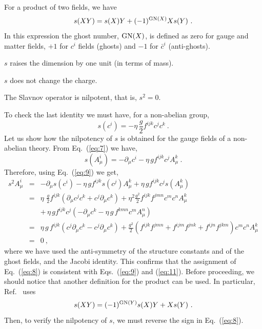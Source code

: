 \documentclass{ws-ijmpa}
\begin{document}
\begin{romanlist}[(ii)]
\item For a product of two fields, we have
  \begin{equation}
    \label{eq:9}
    s( X Y) = s(X) Y + (-1)^{{\rm GN}(X)} X s(Y)  \ .
  \end{equation}
In this expression the ghost number,
 ${\rm GN}(X)$, is defined as zero for gauge and matter fields, $+1$ for
$c^i$ fields (ghosts) and $-1$ for $\bar{c}^i$ (anti-ghosts).

\item $s$ raises the dimension by one unit (in terms of mass).

\item $s$ does not change the charge.

\item The Slavnov operator is nilpotent, that is, $s^2 =0$.

\end{romanlist}

To check the last identity we must have, for a non-abelian group,
%
\begin{equation}
  \label{eq:8}
  s(c^i) = -\eta\, \frac{g}{2} f^{ijk} c^j c^k\ .
\end{equation}
%
Let us show how the nilpotency of $s$ is obtained for the gauge fields
of a non-abelian theory. From Eq.~(\ref{eq:7}) we have,
%
\begin{equation}
  \label{eq:11}
  s(A_\mu^i) = -\partial_\mu c^i - \eta\, g f^{ijk} c^j A_\mu^k\ .
\end{equation}
%
Therefore, using Eq.~(\ref{eq:9}) we get,
%
\begin{eqnarray}
  s^2 A_\mu^i
&=&
-\partial_\mu s(c^i) - \eta\, g f^{ijk} s(c^j)A_\mu^k
  + \eta\, g f^{ijk} c^j s(A_\mu^k)
\nonumber\\
&=&
\eta\, \, \frac{g}{2}f^{ijk} \left( \partial_\mu c^j c^k +
    c^j \partial_\mu c^k \right)
+ \eta^2 \frac{g^2}{2} f^{ijk}
f^{jmn} c^m c^n A_\mu^k
\nonumber\\
&&
+\, \eta\, g f^{ijk} c^j \left(-\partial_\mu c^k
- \eta\, g\, f^{kmn} c^m A_\mu^n\right)
\nonumber\\
&=&
\eta\, g\, f^{ijk} \left( c^j \partial_\mu c^k - c^j \partial_\mu
  c^k \right)
+ \frac{g^2}{2} \left(f^{ijk} f^{jmn} +  f^{ijm} f^{jnk}
+  f^{ijn} f^{jkm} \right)c^m c^n
A_\mu^k
\nonumber\\
&=&
0\ ,
\end{eqnarray}
%
where we have used the anti-symmetry of the structure constants and of
the ghost fields, and the Jacobi identity. This confirms that the
assignment of Eq.~(\ref{eq:8}) is consistent with Eqs.~(\ref{eq:9})
and (\ref{eq:11}).
%
Before proceeding,
we should notice that another definition for the
product can be used.
In particular,
Ref.~ uses
%
\begin{equation}
  \label{eq:10}
  s( X Y) = (-1)^{{\rm GN}(Y)} s(X) Y +  X s(Y)  \ .
\end{equation}
%
Then, to verify the nilpotency of $s$, we must reverse the sign in
Eq.~(\ref{eq:8}). 
\end{document}
